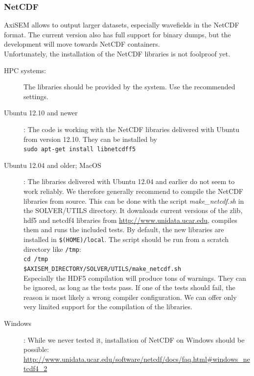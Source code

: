 \documentclass[11pt,letter,fleqn,english,notitlepage]{article}
\begin{document}


 
\subsubsection{NetCDF}
AxiSEM allows to output larger datasets, especially wavefields in the NetCDF format. The current version also has full support for binary dumps, but the development will move towards NetCDF containers.\\
Unfortunately, the installation of the NetCDF libraries is not foolproof yet.
\begin{description}
 \item[HPC systems:] The libraries should be provided by the system. Use the recommended settings.
 \item[Ubuntu 12.10 and newer]: The code is working with the NetCDF libraries delivered with Ubuntu from version 12.10. They can be installed by \\
 \verb|sudo apt-get install libnetcdff5|
 \item[Ubuntu 12.04 and older; MacOS]: The libraries delivered with Ubuntu 12.04 and earlier do not seem to work reliably. We therefore generally recommend to compile the NetCDF libraries from source. This can be done with the script \textit{make\_netcdf.sh} in the SOLVER/UTILS directory. It downloads current versions of the zlib, hdf5 and netcdf4 libraries from \url{http://www.unidata.ucar.edu}, compiles them and runs the included tests. By default, the new libraries are installed in \verb|$(HOME)/local|. The script should be run from a scratch directory like \verb|/tmp|:\\
 \verb|cd /tmp|\\
 \verb|$AXISEM_DIRECTORY/SOLVER/UTILS/make_netcdf.sh|\\
 Especially the HDF5 compilation will produce tons of warnings. They can be ignored, as long as the tests pass. If one of the tests should fail, the reason is most likely a wrong compiler configuration. We can offer only very limited support for the compilation of the libraries. 
 \item[Windows]: While we never tested it, installation of NetCDF on Windows should be possible:
 \url{http://www.unidata.ucar.edu/software/netcdf/docs/faq.html#windows_netcdf4_2}
\end{description}
\end{document}
